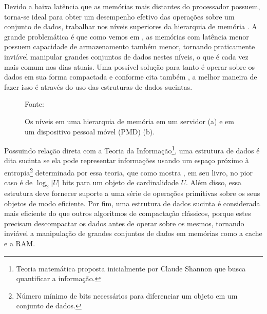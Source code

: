 Devido  a baixa latência que as memórias mais distantes do processador possuem, torna-se ideal para obter um desempenho efetivo das operações sobre um conjunto de dados, trabalhar nos níveis superiores da hierarquia de memória \citep{book-compact-data-structures}. A grande problemática é que como vemos em \citet{paper-gap-between-processor-memory}, as memórias com latência menor possuem capacidade de armazenamento também menor, tornando praticamente inviável manipular grandes conjuntos de dados nestes níveis, o que é cada vez mais comum nos dias atuais. Uma possível solução para tanto é operar sobre os dados em sua forma compactada
e conforme cita também \citeauthor{coira-feranando}, a melhor maneira de fazer isso é através do uso das estruturas de dados sucintas.
\begin{figure}[!ht]
\centering
  \caption[Exemplos de representação gráficas de árvores]{Os níveis em uma hierarquia de memória em um servidor (a) e em um dispositivo pessoal móvel (PMD) (b).}
  \qquad
  \footnotesize{Fonte: \citet{book-computer-architecutre}}
  \label{fig:hierarquia-de-memoria}
\end{figure}

Possuindo relação direta com a Teoria da Informação\footnote{Teoria matemática proposta inicialmente por Claude Shannon que busca quantificar a informação.}, uma estrutura de dados é dita sucinta se ela pode representar informações usando um espaço próximo à entropia\footnote{Número mínimo de bits necessários para diferenciar um objeto em um conjunto de dados.} determinada por essa teoria, que como mostra \citep{book-compact-data-structures}, 
em seu livro, no pior caso é de $\log_2 |U|$ bits para um objeto de cardinalidade $U$.
Além disso, essa estrutura deve fornecer suporte a uma série de operações primitivas sobre os seus objetos de modo eficiente. Por fim, uma estrutura de dados sucinta é considerada mais eficiente do que outros algoritmos de compactação clássicos, porque estes precisam descompactar os dados antes de operar sobre os mesmos, tornando inviável a manipulação de grandes conjuntos de dados em memórias como a cache e a RAM.


